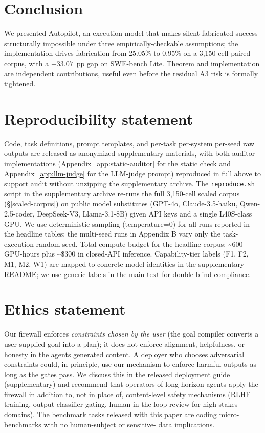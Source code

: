 \section{Conclusion}\label{conclusion}

We presented Autopilot, an execution model that makes silent fabricated
success structurally impossible under three empirically-checkable assumptions; the implementation
drives fabrication from 25.05\% to 0.95\% on a 3{,}150-cell paired corpus, with a $-33.07$~pp gap
on SWE-bench Lite. Theorem and implementation are independent contributions, useful even before
the residual A3 risk is formally tightened.



\section{Reproducibility statement}\label{reproducibility-statement}

Code, task definitions, prompt templates, and per-task per-system per-seed raw outputs are released
as anonymized supplementary materials, with both auditor implementations
(Appendix~\ref{app:static-auditor} for the static check and Appendix~\ref{app:llm-judge} for the
LLM-judge prompt) reproduced in full above to support audit without unzipping the supplementary
archive. The \texttt{reproduce.sh} script in the supplementary archive re-runs the full
3{,}150-cell scaled corpus (\S\ref{scaled-corpus}) on public model substitutes (GPT-4o, Claude-3.5-haiku, Qwen-2.5-coder,
DeepSeek-V3, Llama-3.1-8B) given API keys and a single L40S-class GPU. We use deterministic
sampling (temperature=0) for all runs reported in the headline tables; the multi-seed runs in
Appendix B vary only the task-execution random seed. Total compute budget for the headline
corpus: \textasciitilde600 GPU-hours plus \textasciitilde\$300 in closed-API inference. Capability-tier labels (F1, F2, M1,
M2, W1) are mapped to concrete model identities in the supplementary README; we use generic
labels in the main text for double-blind compliance.



\section{Ethics statement}\label{ethics-statement}

Our firewall enforces \emph{constraints chosen by the user} (the goal compiler converts a user-supplied
goal into a plan); it does not enforce alignment, helpfulness, or honesty in the agent\textquotesingle s
generated content. A deployer who chooses adversarial constraints could, in principle, use our
mechanism to enforce harmful outputs as long as the gates pass. We discuss this in the released
deployment guide (supplementary) and recommend that operators of long-horizon agents apply the
firewall in addition to, not in place of, content-level safety mechanisms (RLHF training,
output-classifier gating, human-in-the-loop review for high-stakes domains). The benchmark
tasks released with this paper are coding micro-benchmarks with no human-subject or sensitive-
data implications.




